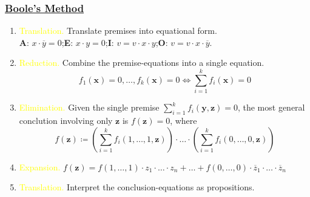 \documentclass[UTF8,11pt,colorlinks,compress,openany]{beamer}%
\begin{document}
\begin{frame}\frametitle{\href{https://www.math.uwaterloo.ca/~snburris/htdocs/MYWORKS/PREPRINTS/BuSa1.pdf}{Boole's Method}}
	\begin{enumerate}
		\item \textcolor{yellow}{Translation.} Translate premises into equational form.\\
		\textbf{A}: $x\cdot\overline{y}=0$;\qquad \textbf{E}: $x\cdot y=0$;\qquad \textbf{I}: $v=v\cdot x\cdot y$;\qquad \textbf{O}: $v=v\cdot x\cdot\overline{y}$.
		\item \textcolor{yellow}{Reduction.} Combine the premise-equations into a single equation. \[f_1(\mathbf{x})=0,\dots,f_k(\mathbf{x})=0\iff \sum\limits_{i=1}^k f_i(\mathbf{x})=0\]
		\item \textcolor{yellow}{Elimination.} Given the single premise $\sum\limits_{i=1}^k f_i(\mathbf{y},\mathbf{z})=0$, the most general conclution involving only $\mathbf{z}$ is $f(\mathbf{z})=0$, where
		\[f(\mathbf{z})\coloneqq \left(\sum\limits_{i=1}^k f_i(1,\dots,1,\mathbf{z})\right)\cdot\ldots\cdot\left(\sum\limits_{i=1}^k f_i(0,\dots,0,\mathbf{z})\right)\]
		\item \textcolor{yellow}{Expansion.} $f(\mathbf{z})=f(1,\dots,1)\cdot z_1\cdot\ldots\cdot z_n+\ldots+f(0,\dots,0)\cdot\overline{z}_1\cdot\ldots\cdot\overline{z}_n$
		\item \textcolor{yellow}{Translation.} Interpret the conclusion-equations as propositions.
	\end{enumerate}
\end{frame}
\end{document}
